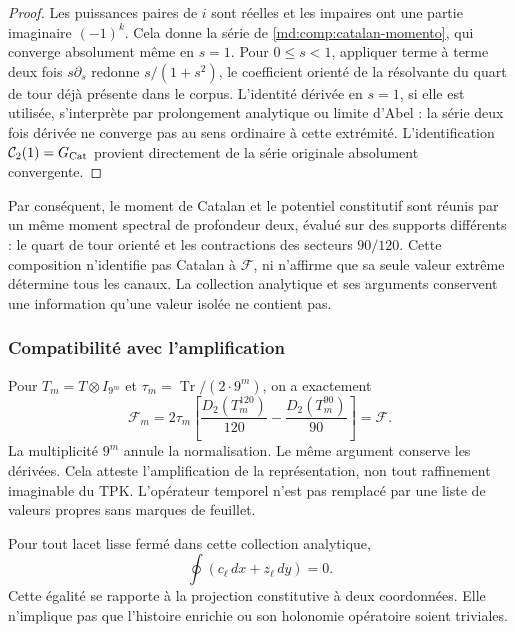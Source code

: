 \begin{proof}
Les puissances paires de \(i\) sont réelles et les impaires ont une partie
imaginaire \((-1)^k\). Cela donne la série de
\eqref{md:comp:catalan-momento}, qui converge absolument même
en \(s=1\). Pour \(0\leq s<1\), appliquer terme à terme deux fois
\(s\partial_s\) redonne \(s/(1+s^2)\), le coefficient orienté de la
résolvante du quart de tour déjà présente dans le corpus.
L’identité dérivée en \(s=1\), si elle est utilisée, s’interprète
par prolongement analytique ou limite d’Abel : la série deux fois
dérivée ne converge pas au sens ordinaire à cette extrémité.
L’identification \(\mathcal C_2(1)=G_{\rm Cat}\) provient directement
de la série originale absolument convergente.
\end{proof}

Par conséquent, le moment de Catalan et le potentiel constitutif sont réunis
par un même moment spectral de profondeur deux, évalué sur des
supports différents : le quart de tour orienté et les contractions
des secteurs \(90/120\). Cette composition n’identifie pas Catalan
à \(\mathscr F\), ni n’affirme que sa seule valeur extrême détermine
tous les canaux. La collection analytique et ses arguments conservent
une information qu’une valeur isolée ne contient pas.

\subsubsection{Compatibilité avec l’amplification}
\label{md:comp:amplificacion-potencial}

Pour \(T_m=T\otimes I_{9^m}\) et
\(\tau_m=\operatorname{Tr}/(2\cdot9^m)\), on a exactement
\begin{equation}
 \mathscr F_m=2\tau_m\left[
 \frac{D_2(T_m^{120})}{120}
 -\frac{D_2(T_m^{90})}{90}\right]=\mathscr F.
 \label{md:comp:potencial-amplificado}
\end{equation}
La multiplicité \(9^m\) annule la normalisation. Le même argument
conserve les dérivées. Cela atteste l’amplification de la
représentation, non tout raffinement imaginable du TPK.
L’opérateur temporel n’est pas remplacé par une liste de valeurs propres
sans marques de feuillet.

Pour tout lacet lisse fermé dans cette collection analytique,
\begin{equation}
 \oint(c_\ell\,dx+z_\ell\,dy)=0.
 \label{md:comp:integral-cerrada}
\end{equation}
Cette égalité se rapporte à la projection constitutive à deux
coordonnées. Elle n’implique pas que l’histoire enrichie ou son holonomie
opératoire soient triviales.

